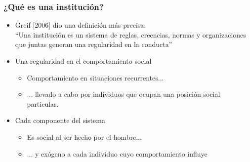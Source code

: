 \documentclass{beamer}
\begin{document}
\begin{frame}
\frametitle{¿Qué es una institución?}
\begin{itemize}
    \item Greif [2006] dio una definición más precisa:
    \\ \vspace{2mm}
    ``Una institución es un sistema de reglas, creencias, normas y organizaciones que juntas generan una regularidad en la conducta''\vspace{2mm}
    \\ \vspace{2mm}
    \item Una regularidad en el comportamiento social 
    \begin{itemize}
        \item Comportamiento en situaciones recurrentes...
        \item ... llevado a cabo por individuos que ocupan una posición social particular.\vspace{2mm}
    \end{itemize}
    \item Cada componente del sistema
    \begin{itemize}
        \item Es social al ser hecho por el hombre...
        \item ... y exógeno a cada individuo cuyo comportamiento influye
    \end{itemize}
\end{itemize} 
\end{frame}
\end{document}
